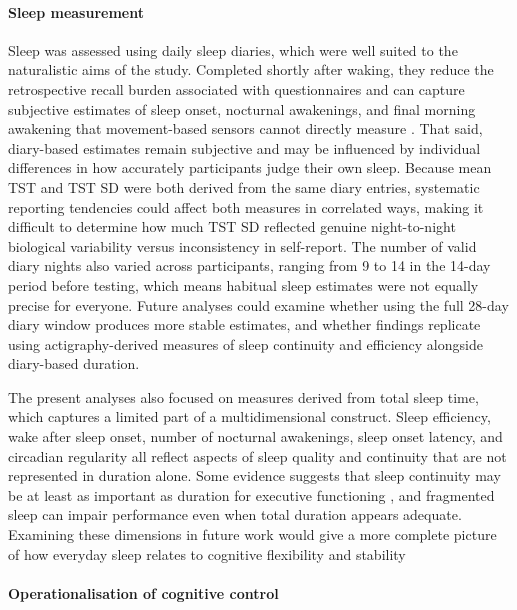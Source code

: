 \documentclass[12pt,a4paper]{report}
\begin{document}
\paragraph{Sleep measurement}

Sleep was assessed using daily sleep diaries, which were well suited to the naturalistic aims of the study. Completed shortly after waking, they reduce the retrospective recall burden associated with questionnaires and can capture subjective estimates of sleep onset, nocturnal awakenings, and final morning awakening that movement-based sensors cannot directly measure \textcite{carney2012consensus}. That said, diary-based estimates remain subjective and may be influenced by individual differences in how accurately participants judge their own sleep. Because mean TST and TST SD were both derived from the same diary entries, systematic reporting tendencies could affect both measures in correlated ways, making it difficult to determine how much TST SD reflected genuine night-to-night biological variability versus inconsistency in self-report. The number of valid diary nights also varied across participants, ranging from 9 to 14 in the 14-day period before testing, which means habitual sleep estimates were not equally precise for everyone. Future analyses could examine whether using the full 28-day diary window produces more stable estimates, and whether findings replicate using actigraphy-derived measures of sleep continuity and efficiency alongside diary-based duration.

The present analyses also focused on measures derived from total sleep time, which captures a limited part of a multidimensional construct. Sleep efficiency, wake after sleep onset, number of nocturnal awakenings, sleep onset latency, and circadian regularity all reflect aspects of sleep quality and continuity that are not represented in duration alone. Some evidence suggests that sleep continuity may be at least as important as duration for executive functioning \parencite{sen2023sleepef, wilckens2014sleeppreparation}, and fragmented sleep can impair performance even when total duration appears adequate. Examining these dimensions in future work would give a more complete picture of how everyday sleep relates to cognitive flexibility and stability

\paragraph{Operationalisation of cognitive control}
\end{document}
